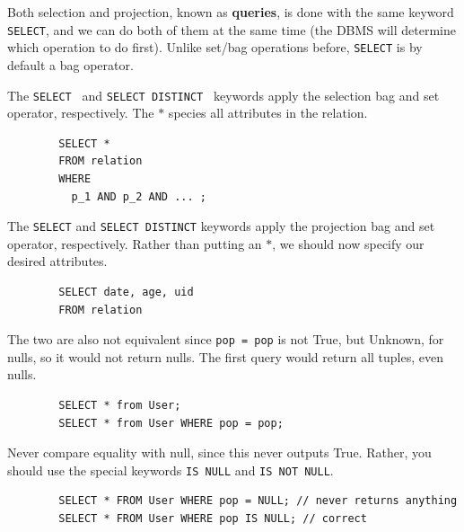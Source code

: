     Both selection and projection, known as \textbf{queries}, is done with the same keyword \texttt{SELECT}, and we can do both of them at the same time (the DBMS will determine which operation to do first). Unlike set/bag operations before, \texttt{SELECT} is by default a bag operator. 

    \begin{definition}[Selection]
      The \texttt{SELECT \*} and \texttt{SELECT DISTINCT \*} keywords apply the selection bag and set operator, respectively. The $\ast$ species all attributes in the relation. 
      \begin{lstlisting}
        SELECT * 
        FROM relation 
        WHERE 
          p_1 AND p_2 AND ... ; 
      \end{lstlisting}
    \end{definition} 

    \begin{definition}[Projection]
      The \texttt{SELECT} and \texttt{SELECT DISTINCT} keywords apply the projection bag and set operator, respectively. Rather than putting an $\ast$, we should now specify our desired attributes. 
      \begin{lstlisting}
        SELECT date, age, uid
        FROM relation 
      \end{lstlisting}
    \end{definition} 

    \begin{example}
      The two are also not equivalent since \texttt{pop = pop} is not True, but Unknown, for nulls, so it would not return nulls. The first query would return all tuples, even nulls. 
      \begin{lstlisting}
        SELECT * from User; 
        SELECT * from User WHERE pop = pop; 
      \end{lstlisting}
    \end{example}

    \begin{example}
      Never compare equality with null, since this never outputs True. Rather, you should use the special keywords \texttt{IS NULL} and \texttt{IS NOT NULL}. 
      \begin{lstlisting}
        SELECT * FROM User WHERE pop = NULL; // never returns anything 
        SELECT * FROM User WHERE pop IS NULL; // correct 
      \end{lstlisting}
    \end{example}

